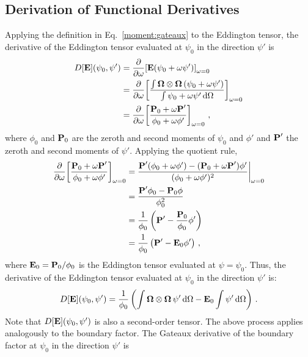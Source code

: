 \documentclass[../doc.tex]{subfiles}
\begin{document}
\subsection{Derivation of Functional Derivatives}
Applying the definition in Eq.~\ref{moment:gateaux} to the Eddington tensor, the derivative of the Eddington tensor evaluated at $\psi_0$ in the direction $\psi'$ is 
	\begin{equation}
	\begin{aligned}
		D[\E](\psi_0,\psi') &= \pderiv{}{\omega} \bracket{\E(\psi_0 + \omega\psi')}_{\omega=0} \\
		&= \pderiv{}{\omega}\bracket{\frac{\int \Omegahat\otimes\Omegahat\paren{\psi_0 + \omega\psi'}}{\int \psi_0 + \omega \psi' \ud \Omega}}_{\omega=0} \\
		&= \pderiv{}{\omega}\bracket{\frac{\P_0 + \omega\P'}{\phi_0 + \omega\phi'}}_{\omega=0} \,,
	\end{aligned}
	\end{equation}
where $\phi_0$ and $\P_0$ are the zeroth and second moments of $\psi_0$ and $\phi'$ and $\P'$ the zeroth and second moments of $\psi'$. Applying the quotient rule, 
	\begin{equation}
	\begin{aligned}
		\pderiv{}{\omega}\bracket{\frac{\P_0 + \omega\P'}{\phi_0 + \omega\phi'}}_{\omega=0} &= \frac{\P'(\phi_0 + \omega \phi') - (\P_0 + \omega\P')\phi'}{(\phi_0 + \omega\phi')^2} \biggr\rvert_{\omega=0} \\
		&= \frac{\P' \phi_0 - \P_0 \phi}{\phi_0^2} \\
		&= \frac{1}{\phi_0}\paren{\P' - \frac{\P_0}{\phi_0} \phi'} \\
		&= \frac{1}{\phi_0}\paren{\P' - \E_0 \phi'} \,, 
	\end{aligned}
	\end{equation}
where $\E_0 = \P_0/\phi_0$ is the Eddington tensor evaluated at $\psi = \psi_0$. 
Thus, the derivative of the Eddington tensor evaluated at $\psi_0$ in the direction $\psi'$ is: 
	\begin{equation} \label{moment:Edd_deriv}
		D[\E](\psi_0,\psi') = \frac{1}{\phi_0} \paren{\int \Omegahat\otimes\Omegahat\,\psi'\ud\Omega - \E_0\int \psi' \ud \Omega} \,. 
	\end{equation}
Note that $D[\E](\psi_0,\psi')$ is also a second-order tensor. The above process applies analogously to the boundary factor. 
The Gateaux derivative of the boundary factor at $\psi_0$ in the direction $\psi'$ is 
\end{document}
